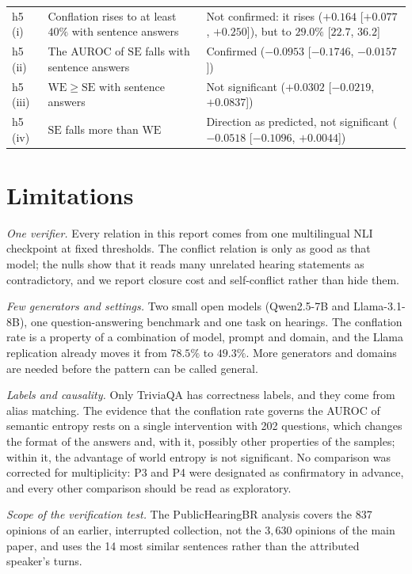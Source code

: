 \documentclass[english]{desafiokunumi}
\theoremstyle{definition}
\theoremstyle{remark}
\newcommand{\SE}{\mathrm{SE}}
\newcommand{\WE}{\mathrm{WE}}
\begin{document}
\begin{table}[ht]
\begin{tabular}{@{}l>{\raggedright\arraybackslash}p{6.2cm}>{\raggedright\arraybackslash}p{5.7cm}@{}}
    \midrule
    h5 (i) & Conflation rises to at least $40\%$ with sentence answers & Not confirmed: it rises ($+0.164$ [$+0.077$, $+0.250$]), but to $29.0\%$ [$22.7$, $36.2$] \\
    h5 (ii) & The AUROC of $\SE$ falls with sentence answers & Confirmed ($-0.0953$ [$-0.1746$, $-0.0157$]) \\
    h5 (iii) & $\WE \ge \SE$ with sentence answers & Not significant ($+0.0302$ [$-0.0219$, $+0.0837$]) \\
    h5 (iv) & $\SE$ falls more than $\WE$ & Direction as predicted, not significant ($-0.0518$ [$-0.1096$, $+0.0044$]) \\
    \bottomrule
  \end{tabular}
\end{table}

\section{Limitations}
\label{sec:lim}

\emph{One verifier.} Every relation in this report comes from one multilingual
NLI checkpoint at fixed thresholds. The conflict relation is only as good as
that model; the nulls show that it reads many unrelated hearing statements as
contradictory, and we report closure cost and self-conflict rather than hide
them.

\emph{Few generators and settings.} Two small open models (Qwen2.5-7B and
Llama-3.1-8B), one question-answering benchmark and one task on hearings. The
conflation rate is a property of a combination of model, prompt and domain,
and the Llama replication already moves it from $78.5\%$ to $49.3\%$. More
generators and domains are needed before the pattern can be called general.

\emph{Labels and causality.} Only TriviaQA has correctness labels, and they
come from alias matching. The evidence that the conflation rate governs the
AUROC of semantic entropy rests on a single intervention with 202 questions,
which changes the format of the answers and, with it, possibly other
properties of the samples; within it, the advantage of world entropy is not
significant. No comparison was corrected for multiplicity: P3 and P4 were
designated as confirmatory in advance, and every other comparison should be
read as exploratory.

\emph{Scope of the verification test.} The PublicHearingBR analysis covers the
837 opinions of an earlier, interrupted collection, not the $3{,}630$ opinions
of the main paper, and uses the 14 most similar sentences rather than the
attributed speaker's turns.
\end{document}
